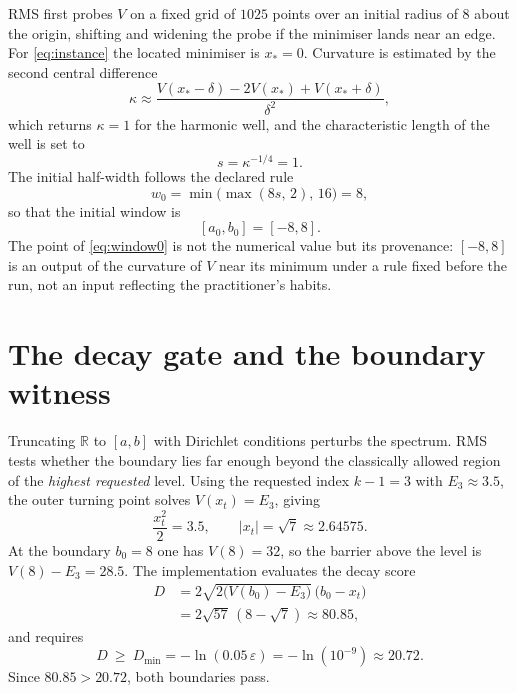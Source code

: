 \documentclass[twocolumn,10pt,a4paper]{article}
\theoremstyle{plain}
\theoremstyle{definition}
\newcommand{\R}{\mathbb{R}}
\newcommand{\eps}{\varepsilon}
\begin{document}
RMS first probes $V$ on a fixed grid of $1025$ points over an initial radius of
$8$ about the origin, shifting and widening the probe if the minimiser lands
near an edge. For \eqref{eq:instance} the located minimiser is $x_{\ast} = 0$.
Curvature is estimated by the second central difference
\begin{equation}
\kappa \approx
\frac{V(x_{\ast}-\delta) - 2V(x_{\ast}) + V(x_{\ast}+\delta)}{\delta^{2}},
\end{equation}
which returns $\kappa = 1$ for the harmonic well, and the characteristic length
of the well is set to
\begin{equation}
s = \kappa^{-1/4} = 1 .
\end{equation}
The initial half-width follows the declared rule
\begin{equation}
w_{0} = \min\!\big(\max(8s,\,2),\,16\big) = 8,
\end{equation}
so that the initial window is
\begin{equation}
\boxed{[a_{0},b_{0}] = [-8,8]} .
\label{eq:window0}
\end{equation}
The point of \eqref{eq:window0} is not the numerical value but its provenance:
$[-8,8]$ is an output of the curvature of $V$ near its minimum under a rule
fixed before the run, not an input reflecting the practitioner's habits.

\section{The decay gate and the boundary witness}
\label{sec:gate}

Truncating $\R$ to $[a,b]$ with Dirichlet conditions perturbs the spectrum. RMS
tests whether the boundary lies far enough beyond the classically allowed region
of the \emph{highest requested} level. Using the requested index $k-1=3$ with
$E_{3}\approx 3.5$, the outer turning point solves $V(x_{t}) = E_{3}$, giving
\begin{equation}
\frac{x_{t}^{2}}{2} = 3.5,\qquad
|x_{t}| = \sqrt{7} \approx 2.64575 .
\end{equation}
At the boundary $b_{0}=8$ one has $V(8) = 32$, so the barrier above the level is
$V(8) - E_{3} = 28.5$. The implementation evaluates the decay score
\begin{equation}
\begin{aligned}
D &= 2\sqrt{2\big(V(b_{0}) - E_{3}\big)}\,\big(b_{0} - x_{t}\big)\\
  &= 2\sqrt{57}\,(8-\sqrt{7}) \approx 80.85,
\end{aligned}
\label{eq:decayscore}
\end{equation}
and requires
\begin{equation}
D \ \ge\ D_{\min} = -\ln(0.05\,\eps) = -\ln(10^{-9}) \approx 20.72 .
\label{eq:decaymin}
\end{equation}
Since $80.85 > 20.72$, both boundaries pass.
\end{document}
